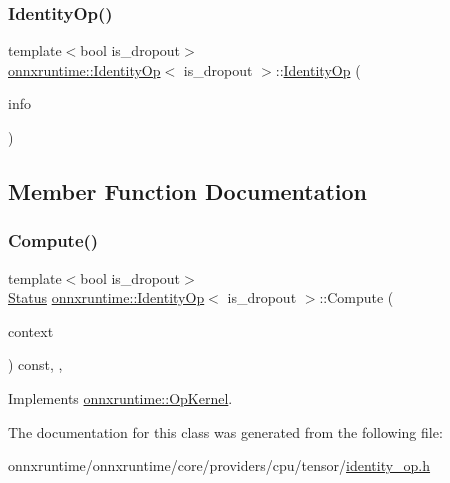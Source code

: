 \subsubsection{\texorpdfstring{Identity\+Op()}{IdentityOp()}}
{\footnotesize\ttfamily template$<$bool is\+\_\+dropout$>$ \\
\mbox{\hyperlink{classonnxruntime_1_1IdentityOp}{onnxruntime\+::\+Identity\+Op}}$<$ is\+\_\+dropout $>$\+::\mbox{\hyperlink{classonnxruntime_1_1IdentityOp}{Identity\+Op}} (\begin{DoxyParamCaption}\item[{const \mbox{\hyperlink{classonnxruntime_1_1OpKernelInfo}{Op\+Kernel\+Info}} \&}]{info }\end{DoxyParamCaption})\hspace{0.3cm}{\ttfamily [inline]}}



\subsection{Member Function Documentation}
\mbox{\label{classonnxruntime_1_1IdentityOp_a2eac9bf7e0bc95300097a840ecc46006}} 
\subsubsection{\texorpdfstring{Compute()}{Compute()}}
{\footnotesize\ttfamily template$<$bool is\+\_\+dropout$>$ \\
\mbox{\hyperlink{classonnxruntime_1_1common_1_1Status}{Status}} \mbox{\hyperlink{classonnxruntime_1_1IdentityOp}{onnxruntime\+::\+Identity\+Op}}$<$ is\+\_\+dropout $>$\+::Compute (\begin{DoxyParamCaption}\item[{\mbox{\hyperlink{classonnxruntime_1_1OpKernelContext}{Op\+Kernel\+Context}} $\ast$}]{context }\end{DoxyParamCaption}) const\hspace{0.3cm}{\ttfamily [inline]}, {\ttfamily [override]}, {\ttfamily [virtual]}}



Implements \mbox{\hyperlink{classonnxruntime_1_1OpKernel_a9eca8656a78b1b3ab9d3351a12798650}{onnxruntime\+::\+Op\+Kernel}}.



The documentation for this class was generated from the following file\+:\begin{DoxyCompactItemize}
\item 
onnxruntime/onnxruntime/core/providers/cpu/tensor/\mbox{\hyperlink{cpu_2tensor_2identity__op_8h}{identity\+\_\+op.\+h}}\end{DoxyCompactItemize}
